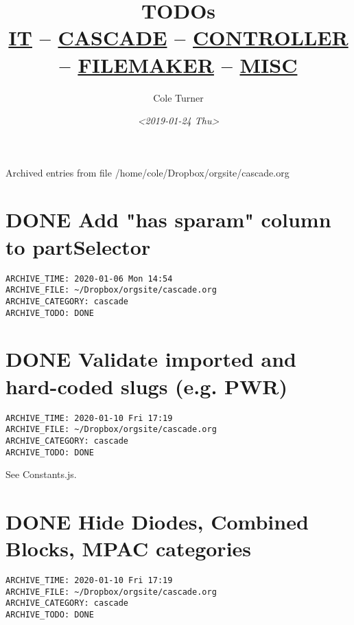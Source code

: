 \documentclass[11pt]{article}
\author{Cole Turner}
\date{\textit{<2019-01-24 Thu>}}
\title{TODOs\\\medskip
\large \href{it.org}{IT} -- \href{cascade.org}{CASCADE} -- \href{controller.org}{CONTROLLER} -- \href{filemaker.org}{FILEMAKER} -- \href{misc.org}{MISC}}
\begin{document}
\maketitle
\tableofcontents

Archived entries from file /home/cole/Dropbox/orgsite/cascade.org\\


\section*{{\bfseries\sffamily DONE}  Add "has sparam" column to partSelector}
\label{sec:org6332f62}
\begin{verbatim}
ARCHIVE_TIME: 2020-01-06 Mon 14:54
ARCHIVE_FILE: ~/Dropbox/orgsite/cascade.org
ARCHIVE_CATEGORY: cascade
ARCHIVE_TODO: DONE
\end{verbatim}

\section*{{\bfseries\sffamily DONE}  Validate imported and hard-coded slugs (e.g. PWR)}
\label{sec:org536d66c}
\begin{verbatim}
ARCHIVE_TIME: 2020-01-10 Fri 17:19
ARCHIVE_FILE: ~/Dropbox/orgsite/cascade.org
ARCHIVE_CATEGORY: cascade
ARCHIVE_TODO: DONE
\end{verbatim}
See Constants.js.\\

\section*{{\bfseries\sffamily DONE}  Hide Diodes, Combined Blocks, MPAC categories}
\label{sec:orgeb545be}
\begin{verbatim}
ARCHIVE_TIME: 2020-01-10 Fri 17:19
ARCHIVE_FILE: ~/Dropbox/orgsite/cascade.org
ARCHIVE_CATEGORY: cascade
ARCHIVE_TODO: DONE
\end{verbatim}
\end{document}
